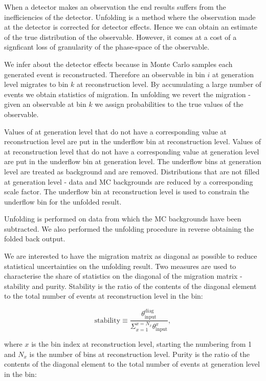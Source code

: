 When a detector makes an observation the end results suffers from the inefficiencies of the detector. Unfolding is a method where the observation made at the detector is corrected for detector effects. Hence we can obtain an estimate of the true distribution of the observable. However, it comes at a cost of a signficant loss of granularity of the phase-space of the observable.

We infer about the detector effects because in Monte Carlo samples each generated event is reconstructed. Therefore an observable in bin $i$ at generation level migrates to bin $k$ at reconstruction level. By accumulating a large number of events we obtain statistics of migration. In unfolding we revert the migration - given an observable at bin $k$ we assign probabilities to the true values of the observable.

Values of \pullangle at generation level that do not have a corresponding value at reconstruction level are put in the underflow bin at reconstruction level. Values of \pullangle at reconstruction level that do not have a corresponding value at generation level are put in the underflow bin at generation level. The underflow bins at generation level are treated as background and are removed. Distributions that are not filled at generation level - data and MC backgrounds are reduced by a corresponding scale factor. The underflow bin at reconstruction level is used to constrain the underflow bin for the unfolded result.

Unfolding is performed on data from which the MC backgrounds have been subtracted. We also performed the unfolding procedure in reverse obtaining the folded back output.

We are interested to have the migration matrix as diagonal as possible to reduce statistical uncertainties on the unfolding result. Two measures are used to characterise the share of statistics on the diagonal of the migration matrix - stability and purity. Stability is the ratio of the contents of the diagonal element to the total number of events at reconstruction level in the bin:

\begin{equation}
  \text{stability}\equiv\frac{\theta^{\text{diag}}_{\text{input}}}{\Sigma_{x=1}^{x=N_{x}}\theta^{x}_{\text{input}}},
\end{equation}

\noindent where $x$ is the bin index at reconstruction level, starting the numbering from 1 and $N_{x}$ is the number of bins at reconstruction level. Purity is the ratio of the contents of the diagonal element to the total number of events at generation level in the bin:

